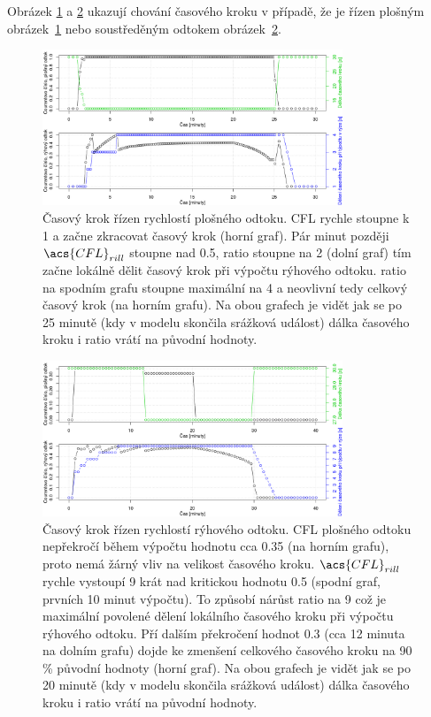   
  Obrázek \ref{fig:cfl1} a \ref{fig:cfl2} ukazují chování časového kroku v případě, že je řízen plošným obrázek~\ref{fig:cfl1} nebo soustředěným odtokem obrázek~\ref{fig:cfl2}. 
%   
%   
  \begin{figure}[p]
    \centering
    \includegraphics[width=0.8\textwidth]{./img/courantratio.png}
    \caption{Časový krok řízen rychlostí plošného odtoku. \acs{CFL} rychle stoupne k 1 a začne zkracovat časový krok (horní graf). Pár minut později $\acs{CFL}_{rill}$ stoupne nad 0.5, \acs{ratio} stoupne na 2 (dolní graf) tím začne lokálně dělit časový krok při výpočtu rýhového odtoku. \acs{ratio} na spodním grafu stoupne maximální na 4 a neovlivní tedy celkový časový krok (na horním grafu). Na obou grafech je vidět jak se po 25 minutě (kdy v modelu skončila srážková událost) dálka časového kroku i \acs{ratio} vrátí na původní hodnoty.}
    \label{fig:cfl1}
  \end{figure}
%   
%   
  \begin{figure}[p]
    \centering
    \includegraphics[width=0.8\textwidth]{./img/courantratio2.png}
    \caption{Časový krok řízen rychlostí rýhového odtoku.  \acs{CFL} plošného odtoku nepřekročí během výpočtu hodnotu cca 0.35 (na horním grafu), proto nemá žárný vliv na velikost časového kroku.  $\acs{CFL}_{rill}$ rychle vystoupí 9 krát nad kritickou hodnotu 0.5 (spodní graf, prvních 10 minut výpočtu). To způsobí nárůst \acs{ratio} na 9 což je maximální povolené dělení lokálního časového kroku při výpočtu rýhového odtoku. Pří dalším překročení hodnot 0.3 (cca 12 minuta na dolním grafu) dojde ke zmenšení celkového časového kroku na 90 \% původní hodnoty (horní graf). Na obou grafech je vidět jak se po 20 minutě (kdy v modelu skončila srážková událost) dálka časového kroku i \acs{ratio} vrátí na původní hodnoty.}
    \label{fig:cfl2}
  \end{figure}
  

